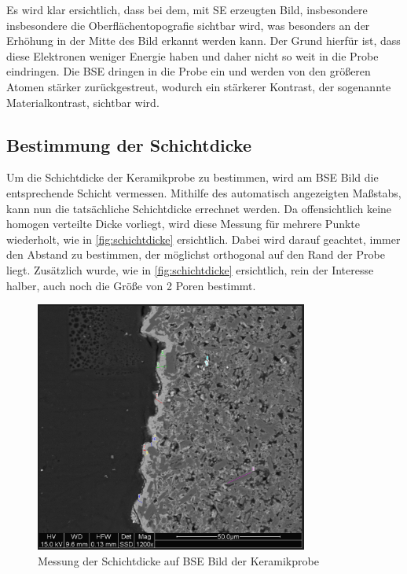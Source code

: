 \documentclass[12pt,english,ngerman]{scrartcl}
\begin{document}
Es wird klar ersichtlich, dass bei dem, mit SE erzeugten Bild, insbesondere
insbesondere die Oberflächentopografie sichtbar wird, was besonders an der
Erhöhung in der Mitte des Bild erkannt werden kann. Der Grund hierfür ist, dass
diese Elektronen weniger Energie haben und daher nicht so weit in die Probe
eindringen. Die BSE dringen in die Probe ein und werden von den größeren Atomen
stärker zurückgestreut, wodurch ein stärkerer Kontrast, der sogenannte
Materialkontrast, sichtbar wird.

\subsection{Bestimmung der Schichtdicke}

Um die Schichtdicke der Keramikprobe zu bestimmen, wird am BSE Bild die
entsprechende Schicht vermessen. Mithilfe des automatisch angezeigten Maßstabs,
kann nun die tatsächliche Schichtdicke errechnet werden. Da offensichtlich
keine homogen verteilte Dicke vorliegt, wird diese Messung für mehrere Punkte
wiederholt, wie in \autoref{fig:schichtdicke} ersichtlich. Dabei wird darauf
geachtet, immer den Abstand zu bestimmen, der möglichst orthogonal auf den Rand
der Probe liegt. Zusätzlich wurde, wie in \autoref{fig:schichtdicke}
ersichtlich, rein der Interesse halber, auch noch die Größe von 2 Poren
bestimmt.

\begin{figure}[H]
	\begin{center}
		\includegraphics[width =0.8\textwidth]{./figures/schichtdicke.png}
	\end{center}
	\caption{Messung der Schichtdicke auf BSE Bild der Keramikprobe
	}\label{fig:schichtdicke}
\end{figure}
\end{document}
